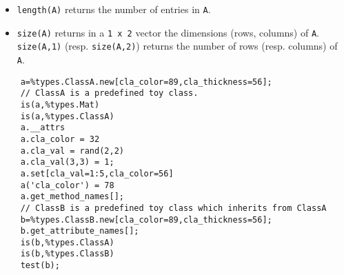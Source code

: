 \begin{itemize}
\item \verb+length(A)+ returns the number of entries in \verb+A+.
\item \verb+size(A)+ returns in a \verb+1 x 2+ vector the dimensions (rows, columns)
  of \verb+A+. \verb+size(A,1)+ (resp. \verb+size(A,2)+) returns the number of rows 
  (resp. columns) of \verb+A+.
\end{itemize}

\begin{examples}
  \begin{Verbatim}
    a=%types.ClassA.new[cla_color=89,cla_thickness=56];
    // ClassA is a predefined toy class.
    is(a,%types.Mat) 
    is(a,%types.ClassA) 
    a.__attrs
    a.cla_color = 32 
    a.cla_val = rand(2,2)
    a.cla_val(3,3) = 1;
    a.set[cla_val=1:5,cla_color=56]
    a('cla_color') = 78 
    a.get_method_names[];
    // ClassB is a predefined toy class which inherits from ClassA
    b=%types.ClassB.new[cla_color=89,cla_thickness=56];
    b.get_attribute_names[];
    is(b,%types.ClassA) 
    is(b,%types.ClassB) 
    test(b);
  \end{Verbatim}
\end{examples}

\begin{manseealso}

\end{manseealso}


